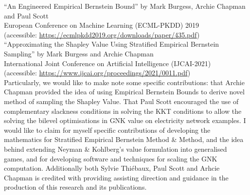 \noindent``An Engineered Empirical Bernstein Bound'' by Mark Burgess, Archie Chapman and Paul Scott\\ European Conference on Machine Learning (ECML-PKDD) 2019\\
(accessible: \href{https://ecmlpkdd2019.org/downloads/paper/435.pdf}{https://ecmlpkdd2019.org/downloads/paper/435.pdf})\\


\noindent``Approximating the Shapley Value Using Stratified Empirical Bernstein Sampling'' by Mark Burgess and Archie Chapman\\ International Joint Conference on Artificial Intelligence (IJCAI-2021)\\
(accessible: \href{https://www.ijcai.org/proceedings/2021/0011.pdf}{https://www.ijcai.org/proceedings/2021/0011.pdf})\\


Particularly, we would like to make note some specific contributions: that Archie Chapman provided the idea of using Empirical Bernstein Bounds to derive novel method of sampling the Shapley Value.
That Paul Scott encouraged the use of complementary slackness conditions in solving the KKT conditions to allow the solving the bilevel optimisations in GNK value on electricity network examples.
I would like to claim for myself specific contributions of developing the mathematics for Stratified Empirical Bernstein Method \& Method, and the idea behind extending Neyman \& Kohlberg's value formulation into generalised games, and for developing software and techniques for scaling the GNK computation.
Additionally both Sylvie Thi\'{e}baux, Paul Scott and Arhcie Chapman is credited with providing assisting direction and guidance in the production of this research and its publications.



